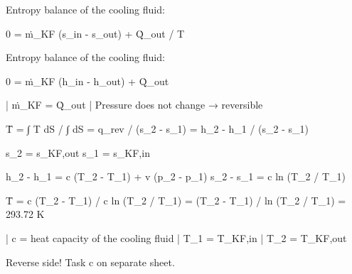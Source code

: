 Entropy balance of the cooling fluid:  

0 = ṁ_KF (s_in - s_out) + Q̇_out / T  

Entropy balance of the cooling fluid:  

0 = ṁ_KF (h_in - h_out) + Q̇_out  

| ṁ_KF = Q̇_out  
| Pressure does not change → reversible  

T̄ = ∫ T dS / ∫ dS = q_rev / (s_2 - s_1) = h_2 - h_1 / (s_2 - s_1)  

s_2 = s_KF,out  
s_1 = s_KF,in  

h_2 - h_1 = c (T_2 - T_1) + v (p_2 - p_1)  
s_2 - s_1 = c ln (T_2 / T_1)  

T̄ = c (T_2 - T_1) / c ln (T_2 / T_1) = (T_2 - T_1) / ln (T_2 / T_1) = 293.72 K  

| c = heat capacity of the cooling fluid  
| T_1 = T_KF,in  
| T_2 = T_KF,out  

Reverse side! Task c on separate sheet.